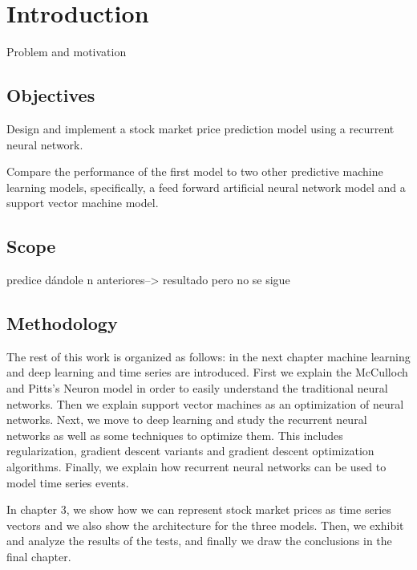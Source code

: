 \chapter{Introduction}
\label{ch:introsm}

Problem and motivation

\section{Objectives}
Design and implement a stock market price prediction model using a recurrent neural network.

Compare the performance of the first model to two other predictive machine learning models, specifically, a feed forward artificial neural network model and a support vector machine model.

\section{Scope}

predice dándole n anteriores--> resultado pero no se sigue 

\section{Methodology}
The rest of this work is organized as follows: in the next chapter machine learning and deep learning and time series are introduced. First we explain the McCulloch and Pitts's Neuron model in order to easily understand the traditional neural networks. Then we explain support vector machines as an optimization of neural networks.
Next, we move to deep learning and study the recurrent neural networks as well as some techniques to optimize them. This includes regularization, gradient descent variants and gradient descent optimization algorithms. Finally, we explain how recurrent neural networks can be used to model time series events. 

In  chapter 3, we show how we can represent stock market prices as time series vectors and we also show the architecture for the three models. Then, we exhibit and analyze  the results of the tests, and finally we draw the conclusions in the final chapter.

